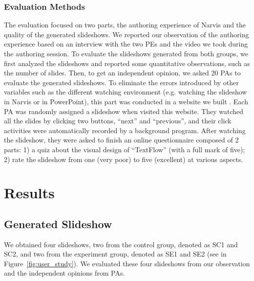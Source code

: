 \subsubsection{Evaluation Methods}
The evaluation focused on two parts, the authoring experience of Narvis and the quality of the generated slideshows. We reported our observation of the authoring experience based on an interview with the two PEs and the video we took during the authoring session. 
To evaluate the slideshows generated from both groups, we first analyzed the slideshows and reported some quantitative observations, such as the number of slides.
Then, to get an independent opinion, we asked 20 PAs to evaluate the generated slideshows. To eliminate the errors introduced by other variables such as the different watching environment (e.g. watching the slideshow in Narvis or in PowerPoint), this part was conducted in a website we built . Each PA was randomly assigned a slideshow when visited this website. They watched all the slides by clicking two buttons, ``next'' and ``previous'', and their click activities were automatically recorded by a background program.  After watching the slideshow, they were asked to finish an online questionnaire composed of 2 parts: 1) a quiz about the visual design of ``TextFlow'' (with a full mark of five); 2) rate the slideshow from one (very poor) to five (excellent) at various aspects. 

\section{Results}
\subsection{Generated Slideshow}
We obtained four slideshows, two from the control group, denoted as SC1 and SC2, and two from the experiment group, denoted as SE1 and SE2 (see in Figure~\ref{fig:user_study}). We evaluated these four slideshows from our observation and the independent opinions from PAs. 



